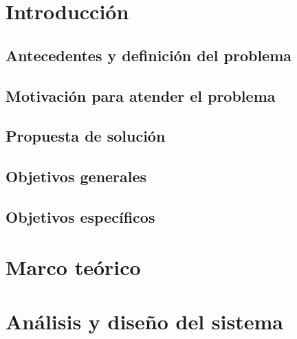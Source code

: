 \documentclass[12pt]{report}
\begin{document}
\newpage

 
\newpage


\newpage
\tableofcontents

\newpage
\listoftables
{} %
\listoffigures
{}
\lstlistoflistings

\chapter{Introducción}


\section{Antecedentes y definición del problema}


\section{Motivación para atender el problema}


\section{Propuesta de solución}


\section{Objetivos generales}


\section{Objetivos específicos}



\chapter{Marco teórico}


\chapter{Análisis y diseño del sistema}


\printbibliography
\end{document}
